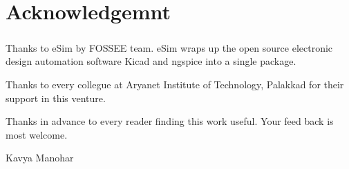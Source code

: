 \chapter*{Acknowledgemnt}

\paragraph{}

Thanks to eSim by FOSSEE team. eSim wraps up the open source electronic design automation software Kicad and ngspice into a single package.

Thanks to every collegue at Aryanet Institute of Technology, Palakkad for their support in this venture. 

Thanks in advance to every reader finding this work useful. Your feed back is most welcome.

\begin{flushright} Kavya Manohar \end{flushright}